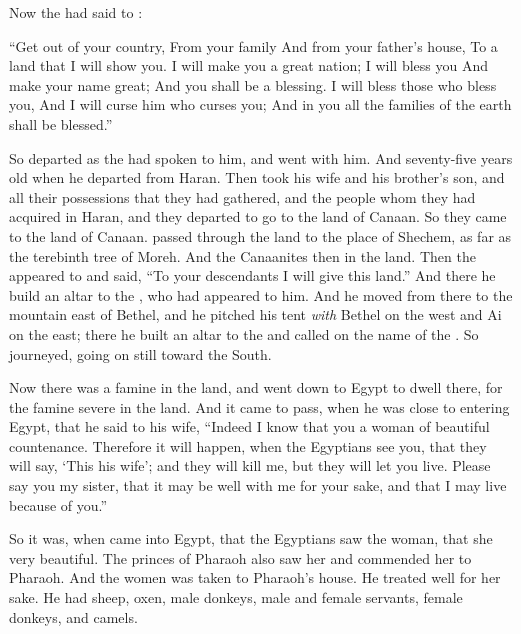 
\bverse Now the \lord had said to :
\begin{bquotation}
``Get out of your country, From your family And from your father's house, To a land that I will show you. \bverse I will make you a great nation; I will bless you And make your name great; And you shall be a blessing. \bverse I will bless those who bless you, And I will curse him who curses you; And in you all the families of the earth shall be blessed.''
\end{bquotation}

\bverse So  departed as the \lord had spoken to him, and  went with him. And  \was seventy-five years old when he departed from Haran.
\bverse Then  took  his wife and  his brother's son, and all their possessions that they had gathered, and the people whom they had acquired in Haran, and they departed to go to the land of Canaan. So they came to the land of Canaan.
\bverse {} passed through the land to the place of Shechem, as far as the terebinth tree of Moreh. And the Canaanites \were then in the land.
\bverse Then the \lord appeared to  and said, ``To your descendants I will give this land.'' And there he build an altar to the \lord, who had appeared to him.
\bverse And he moved from there to the mountain east of Bethel, and he pitched his tent \textit{with} Bethel on the west and Ai on the east; there he built an altar to the \lord and called on the name of the \lord.
\bverse So  journeyed, going on still toward the South.


\bverse Now there was a famine in the land, and  went down to Egypt to dwell there, for the famine \was severe in the land.
\bverse And it came to pass, when he was close to entering Egypt, that he said to  his wife, ``Indeed I know that you \are a woman of beautiful countenance.
\bverse Therefore it will happen, when the Egyptians see you, that they will say, `This \is his wife'; and they will kill me, but they will let you live.
\bverse Please say you \are my sister, that it may be well with me for your sake, and that I may live because of you.''

\bverse So it was, when  came into Egypt, that the Egyptians saw the woman, that she \was very beautiful.
\bverse The princes of Pharaoh also saw her and commended her to Pharaoh. And the women was taken to Pharaoh's house.
\bverse He treated  well for her sake. He had sheep, oxen, male donkeys, male and female servants, female donkeys, and camels.

